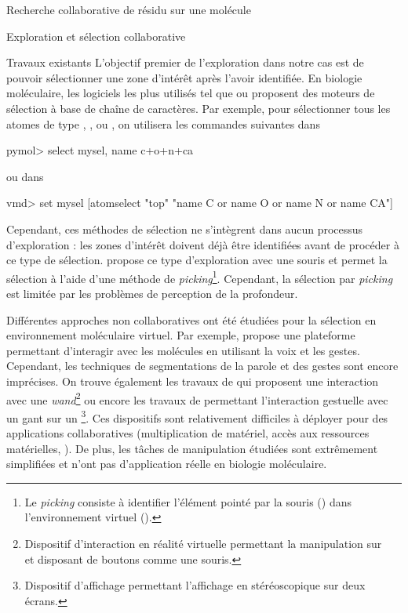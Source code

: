 \documentclass[myfrancais,ngerman,english,french]{mythesis}
\begin{document}
\begin{mychapter}{Recherche collaborative de résidu sur une molécule}
\begin{mysection}{Exploration et sélection collaborative}
\begin{mysubsection}{Travaux existants}
				L'objectif premier de l'exploration dans notre cas est de pouvoir sélectionner une zone d'intérêt après l'avoir identifiée.
				En biologie moléculaire, les logiciels les plus utilisés tel que \myPyMOL ou  proposent des moteurs de sélection à base de chaîne de caractères.
				Par exemple, pour sélectionner tous les atomes de type , ,  ou , on utilisera les commandes suivantes dans \myPyMOL
				\begin{mySource*}[language={}]
pymol> select mysel, name c+o+n+ca
				\end{mySource*}
				ou dans 
				\begin{mySource*}[language={}]
vmd> set mysel [atomselect "top" "name C or name O or name N or name CA"]
				\end{mySource*}

				Cependant, ces méthodes de sélection ne s'intègrent dans aucun processus d'exploration : les zones d'intérêt doivent déjà être identifiées avant de procéder à ce type de sélection.
				 propose ce type d'exploration avec une souris et permet la sélection à l'aide d'une méthode de \textit{picking}\footnote{Le \textit{picking} consiste à identifier l'élément pointé par la souris (\myTwoD) dans l'environnement virtuel (\myThreeD).}.
				Cependant, la sélection par \textit{picking} est limitée par les problèmes de perception de la profondeur.

				Différentes approches non collaboratives ont été étudiées pour la sélection en environnement moléculaire virtuel.
				Par exemple,  propose une plateforme permettant d'interagir avec les molécules en utilisant la voix et les gestes.
				Cependant, les techniques de segmentations de la parole et des gestes sont encore imprécises.
				On trouve également les travaux de  qui proposent une interaction avec une \textit{wand}\footnote{Dispositif d'interaction en réalité virtuelle permettant la manipulation sur ~ et disposant de boutons comme une souris.} ou encore les travaux de  permettant l'interaction gestuelle avec un gant sur un \myWorkbench\footnote{Dispositif d'affichage permettant l'affichage en \myThreeD stéréoscopique sur deux écrans.}.
				Ces dispositifs sont relativement difficiles à déployer pour des applications collaboratives (multiplication de matériel, accès aux ressources matérielles, \myetc).
				De plus, les tâches de manipulation étudiées sont extrêmement simplifiées et n'ont pas d'application réelle en biologie moléculaire.


\end{mysubsection}
\end{mysection}
\end{mychapter}
\end{document}
